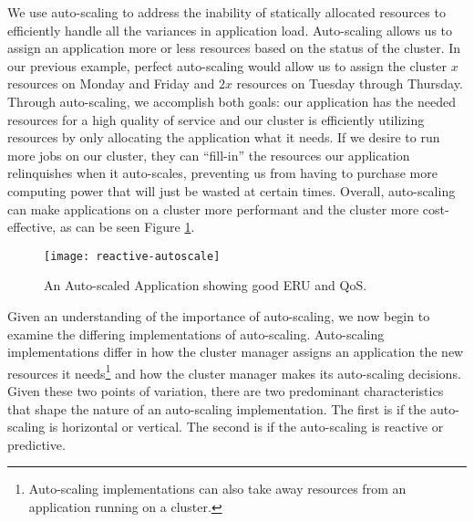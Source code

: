 We use auto-scaling to address the inability of statically allocated
resources to efficiently handle all the variances in application load.
Auto-scaling allows us to assign an application more or less resources based on
the status of the cluster. In our previous example, perfect auto-scaling
would allow us to assign the cluster $x$ resources on Monday and Friday and
$2x$ resources on Tuesday through Thursday. Through auto-scaling, we accomplish
both goals: our application has the needed resources for a high quality
of service and our cluster is efficiently utilizing resources by only
allocating the application what it needs. If we desire to run more jobs on our
cluster, they can ``fill-in'' the resources our application relinquishes when it
auto-scales, preventing us from having to purchase more computing power that
will just be wasted at certain times.
Overall, auto-scaling can make applications on a cluster more performant and
the cluster more cost-effective, as can be seen Figure
\ref{fig:reactive-autoscale}.

\begin{figure}[!h]
  \centerline{\texttt{[image: reactive-autoscale]}}
  \caption{An Auto-scaled Application showing good ERU and QoS.}
  \label{fig:reactive-autoscale}
\end{figure}

Given an understanding of the importance of auto-scaling, we now begin to
examine the differing implementations of auto-scaling. Auto-scaling
implementations differ in how the cluster manager
assigns an application the new resources it
needs\footnote{Auto-scaling implementations can also take away resources from
an application running on a cluster.} and how the cluster manager makes its
auto-scaling decisions. Given these two points of
variation, there are two predominant characteristics that shape the nature of an auto-scaling
implementation. The first is if the auto-scaling is horizontal or vertical. The
second is if the auto-scaling is reactive or predictive.

